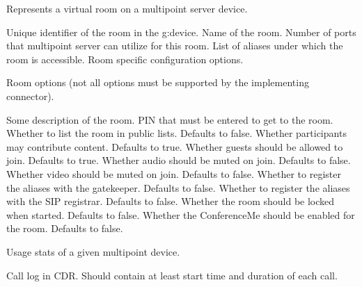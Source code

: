 \begin{Api}
Represents a virtual room on a multipoint server device.
\begin{ApiClassAttributes}
 Unique identifier of the room in the \gls{g:device}.
 Name of the room.
 Number of ports that multipoint server can utilize for this room.
 List of aliases under which the room is accessible.
 Room specific configuration options.
\end{ApiClassAttributes}

Room options (not all options must be supported by the implementing connector).
\begin{ApiEnumValues}
 Some description of the room.
 PIN that must be entered to get to the room.
 Whether to list the room in public lists. Defaults to false.
 Whether participants may contribute content. Defaults to true.
 Whether guests should be allowed to join. Defaults to true.
 Whether audio should be muted on join. Defaults to false.
 Whether video should be muted on join. Defaults to false.
 Whether to register the aliases with the gatekeeper. Defaults to false.
 Whether to register the aliases with the SIP registrar. Defaults to false.
 Whether the room should be locked when started. Defaults to false.
 Whether the ConferenceMe should be enabled for the room. Defaults to false.
\end{ApiEnumValues}

Usage stats of a given multipoint device.
\begin{ApiClassAttributes}
 Call log in CDR. Should contain at least start time and duration of each call.
\end{ApiClassAttributes}


\end{Api}
